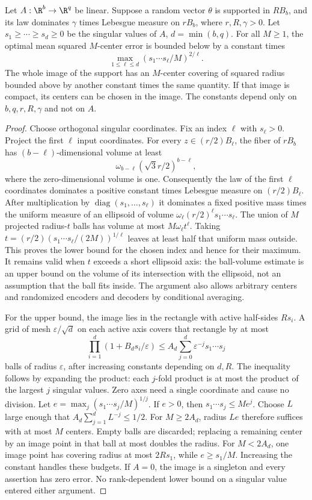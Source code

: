 \begin{lemma}
\label{lem:v18-thick-linear}
Let $A:\R^b\to\R^q$ be linear. Suppose a random vector $\theta$ is
supported in $RB_b$, and its law dominates $\gamma$ times Lebesgue
measure on $rB_b$, where $r,R,\gamma>0$. Let $s_1\ge\cdots\ge s_d\ge0$
be the singular values of $A$, $d=\min(b,q)$. For all $M\ge1$, the
optimal mean squared $M$-center error is bounded below by a constant
times
\[
 \max_{1\le\ell\le d}(s_1\cdots s_\ell/M)^{2/\ell}.
\]
The whole image of the support has an $M$-center covering of squared
radius bounded above by another constant times the same quantity.
If that image is compact, its centers can be chosen in the image.
The constants depend only on $b,q,r,R,\gamma$ and not on $A$.
\end{lemma}
\begin{proof}
Choose orthogonal singular coordinates. Fix an index $\ell$ with
$s_\ell>0$. Project the first $\ell$ input coordinates. For every
$z\in(r/2)B_\ell$, the fiber of $rB_b$ has
$(b-\ell)$-dimensional volume at least
\[
 \omega_{b-\ell}(\sqrt3r/2)^{b-\ell},
\]
where the zero-dimensional volume is one. Consequently the law of
the first $\ell$ coordinates dominates a positive constant times
Lebesgue measure on $(r/2)B_\ell$. After multiplication by
$\operatorname{diag}(s_1,\ldots,s_\ell)$ it dominates a fixed positive
mass times the uniform measure of an ellipsoid of volume
$\omega_\ell(r/2)^\ell s_1\cdots s_\ell$. The union of $M$
projected radius-$t$ balls has volume at most $M\omega_\ell t^\ell$.
Taking $t=(r/2)(s_1\cdots s_\ell/(2M))^{1/\ell}$ leaves at least
half that uniform mass outside. This proves the lower bound for the
chosen index and hence for their maximum. It remains valid when $t$
exceeds a short ellipsoid axis: the ball-volume estimate is an upper
bound on the volume of its intersection with the ellipsoid, not an
assumption that the ball fits inside. The argument also allows arbitrary
centers and randomized encoders and decoders by conditional averaging.

For the upper bound, the image lies in the rectangle with active
half-sides $Rs_i$. A grid of mesh $\varepsilon/\sqrt d$ on each active
axis covers that rectangle by at most
\[
 \prod_{i=1}^d(1+B_ds_i/\varepsilon)
 \le A_d\sum_{j=0}^d\varepsilon^{-j}s_1\cdots s_j
\]
balls of radius $\varepsilon$, after increasing constants depending
on $d,R$. The inequality follows by expanding the product: each
$j$-fold product is at most the product of the largest $j$ singular
values. Zero axes need a single coordinate and cause no division.
Let $e=\max_j(s_1\cdots s_j/M)^{1/j}$. If $e>0$, then
$s_1\cdots s_j\le Me^j$. Choose $L$ large enough that
$A_d\sum_{j=1}^dL^{-j}\le1/2$. For $M\ge2A_d$, radius $Le$
therefore suffices with at most $M$ centers. Empty balls are discarded;
replacing a remaining center by an image point in that ball at most
doubles the radius. For $M<2A_d$, one image point has covering radius
at most $2Rs_1$, while $e\ge s_1/M$. Increasing the constant handles
these budgets. If $A=0$, the image is a singleton and every assertion
has zero error. No rank-dependent lower bound on a singular value
entered either argument.
\end{proof}

